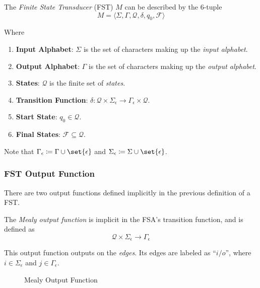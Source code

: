 \begin{definition}
    The \textit{Finite State Transducer} (FST) $M$ can be described by the 6-tuple
    \begin{equation}
        M = \langle
            \Sigma,
            \Gamma,
            \mathcal{Q},
            \delta,
            q_0,
            \mathcal{F}
        \rangle
    \end{equation}
    
    Where
    \begin{enumerate}
        \item \textbf{Input Alphabet}: $\Sigma$ is the set of characters making up the \textit{input alphabet}.
        \item \textbf{Output Alphabet}: $\Gamma$ is the set of characters making up the \textit{output alphabet}.
        \item \textbf{States}: $\mathcal{Q}$ is the finite set of \textit{states}.
        \item \textbf{Transition Function}: $\delta \colon \mathcal{Q} \times \Sigma_{\epsilon} \to \Gamma_{\epsilon} \times \mathcal{Q}$.
        \item \textbf{Start State}: $q_0 \in \mathcal{Q}$.
        \item \textbf{Final States}: $\mathcal{F} \subseteq \mathcal{Q}$.
    \end{enumerate}
    
    Note that $\Gamma_{\epsilon} \coloneqq \Gamma \cup \set{\epsilon}$ and $\Sigma_{\epsilon} \coloneqq \Sigma \cup \set{\epsilon}$.
\end{definition}

\subsubsection{FST Output Function}

There are two output functions defined implicitly in the previous definition of a FST.

\begin{definition}
    The \textit{Mealy output function} is implicit in the FSA's transition function, and is defined as
    \begin{equation}
        \mathcal{Q} \times \Sigma_{\epsilon} \to \Gamma_{\epsilon}
    \end{equation}
    
    This output function outputs on the \textit{edges}. Its edges are labeled as \enquote{$i/o$}, where $i \in \Sigma_{\epsilon}$ and $j \in \Gamma_{\epsilon}$.
    
    \begin{figure}[H]
        \centering
        \caption{Mealy Output Function}
        \label{fig:fst-mealy}
    \end{figure}
\end{definition}

